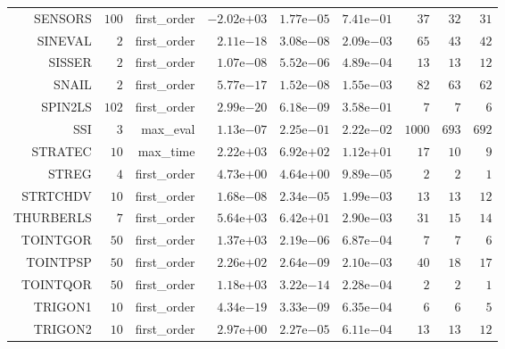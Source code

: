 \begin{longtable}{rrrrrrrrr}
SENSORS & \(   100\) & first\_order & \(-2.02\)e\(+03\) & \( 1.77\)e\(-05\) & \( 7.41\)e\(-01\) & \(    37\) & \(    32\) & \(    31\) \\
SINEVAL & \(     2\) & first\_order & \( 2.11\)e\(-18\) & \( 3.08\)e\(-08\) & \( 2.09\)e\(-03\) & \(    65\) & \(    43\) & \(    42\) \\
SISSER & \(     2\) & first\_order & \( 1.07\)e\(-08\) & \( 5.52\)e\(-06\) & \( 4.89\)e\(-04\) & \(    13\) & \(    13\) & \(    12\) \\
SNAIL & \(     2\) & first\_order & \( 5.77\)e\(-17\) & \( 1.52\)e\(-08\) & \( 1.55\)e\(-03\) & \(    82\) & \(    63\) & \(    62\) \\
SPIN2LS & \(   102\) & first\_order & \( 2.99\)e\(-20\) & \( 6.18\)e\(-09\) & \( 3.58\)e\(-01\) & \(     7\) & \(     7\) & \(     6\) \\
SSI & \(     3\) & max\_eval & \( 1.13\)e\(-07\) & \( 2.25\)e\(-01\) & \( 2.22\)e\(-02\) & \(  1000\) & \(   693\) & \(   692\) \\
STRATEC & \(    10\) & max\_time & \( 2.22\)e\(+03\) & \( 6.92\)e\(+02\) & \( 1.12\)e\(+01\) & \(    17\) & \(    10\) & \(     9\) \\
STREG & \(     4\) & first\_order & \( 4.73\)e\(+00\) & \( 4.64\)e\(+00\) & \( 9.89\)e\(-05\) & \(     2\) & \(     2\) & \(     1\) \\
STRTCHDV & \(    10\) & first\_order & \( 1.68\)e\(-08\) & \( 2.34\)e\(-05\) & \( 1.99\)e\(-03\) & \(    13\) & \(    13\) & \(    12\) \\
THURBERLS & \(     7\) & first\_order & \( 5.64\)e\(+03\) & \( 6.42\)e\(+01\) & \( 2.90\)e\(-03\) & \(    31\) & \(    15\) & \(    14\) \\
TOINTGOR & \(    50\) & first\_order & \( 1.37\)e\(+03\) & \( 2.19\)e\(-06\) & \( 6.87\)e\(-04\) & \(     7\) & \(     7\) & \(     6\) \\
TOINTPSP & \(    50\) & first\_order & \( 2.26\)e\(+02\) & \( 2.64\)e\(-09\) & \( 2.10\)e\(-03\) & \(    40\) & \(    18\) & \(    17\) \\
TOINTQOR & \(    50\) & first\_order & \( 1.18\)e\(+03\) & \( 3.22\)e\(-14\) & \( 2.28\)e\(-04\) & \(     2\) & \(     2\) & \(     1\) \\
TRIGON1 & \(    10\) & first\_order & \( 4.34\)e\(-19\) & \( 3.33\)e\(-09\) & \( 6.35\)e\(-04\) & \(     6\) & \(     6\) & \(     5\) \\
TRIGON2 & \(    10\) & first\_order & \( 2.97\)e\(+00\) & \( 2.27\)e\(-05\) & \( 6.11\)e\(-04\) & \(    13\) & \(    13\) & \(    12\) \\

\end{longtable}
